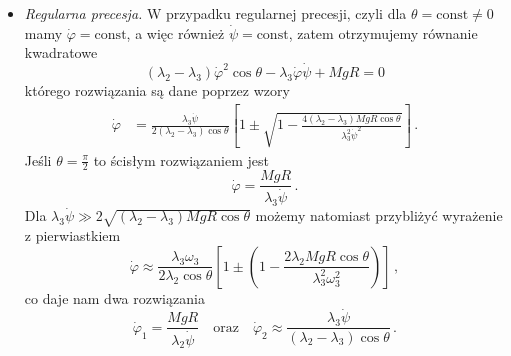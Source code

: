 \documentclass[../main.tex]{subfiles}
\begin{document}
    \begin{itemize}
        \item \textit{Regularna precesja.}  W przypadku regularnej precesji, czyli dla
        \(\theta=\text{const}\neq0\) mamy \(\dot\varphi=\text{const}\), a więc również
        \(\dot\psi=\text{const}\), zatem otrzymujemy równanie kwadratowe
    \begin{equation*}
        (\lambda_2-\lambda_3)\dot{\varphi}^2\cos\theta-\lambda_3\dot{\varphi}\dot\psi+MgR=0
    \end{equation*}
    którego rozwiązania są dane poprzez wzory
    \begin{equation*}
    \begin{split}
        \dot{\varphi}&=\frac{\lambda_3\dot\psi}{2(\lambda_2-\lambda_3)\cos\theta}\left[1\pm\sqrt{1-\frac{4(\lambda_2-\lambda_3)MgR\cos\theta}{\lambda_3^2\dot{\psi}^2}}\right]\,.
    \end{split}
    \end{equation*}
    Jeśli \(\theta=\frac{\pi}{2}\) to ścisłym rozwiązaniem jest
    \begin{equation*}
        \dot{\varphi}=\frac{MgR}{\lambda_3\dot{\psi}}\,.
    \end{equation*}
    Dla \(\lambda_3\dot\psi\gg2\sqrt{(\lambda_2-\lambda_3)MgR\cos\theta}\) możemy natomiast
    przybliżyć wyrażenie z pierwiastkiem
    \begin{equation*}
        \dot{\varphi}\approx\frac{\lambda_3\omega_3}{2\lambda_2\cos\theta}\left[1\pm \left(1-\frac{2\lambda_2MgR\cos\theta}{\lambda_3^2\omega_3^2}\right)\right]\,,
    \end{equation*}
    co daje nam dwa rozwiązania
    \begin{equation*}
        \dot{\varphi}_1=\frac{MgR}{\lambda_2\dot\psi}\quad\text{oraz}\quad \dot{\varphi}_2\approx\frac{\lambda_3\dot{\psi}}{(\lambda_2-\lambda_3)\cos\theta}\,.
    \end{equation*}
    

\end{itemize}
\end{document}
